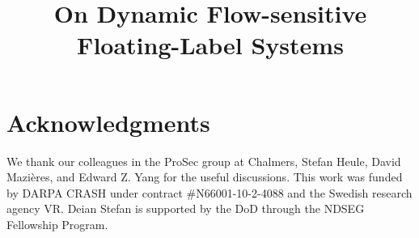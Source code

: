 \documentclass[10pt, conference, compsocconf, letterpaper]{IEEEtran}
\newif\ifextended
\begin{document}
\title{On Dynamic Flow-sensitive Floating-Label Systems}
\ifextended
\subtitle{Extended Version}

\fi

\author{
\and
{}
\and
{}
}


\maketitle













\section*{Acknowledgments}
We thank our colleagues in the ProSec group at Chalmers, Stefan Heule,
David Mazi{\`e}res, and Edward Z. Yang for the useful discussions.
%
This work was funded by DARPA CRASH under contract \#N66001-10-2-4088
and the Swedish research agency VR.
%
Deian Stefan is supported by the DoD through the NDSEG Fellowship
Program.

{\frenchspacing


}

\end{document}
